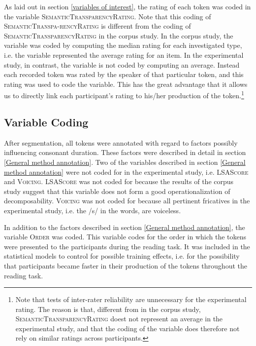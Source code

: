  As laid out in section \ref{variables of interest}, the rating of each token was coded in the variable  \textsc{SemanticTransparencyRating}. Note that this coding of \textsc{SemanticTranspa-rencyRating} is different from the coding of \textsc{SemanticTransparencyRating} in the corpus study. In the corpus study, the variable was coded by computing the median rating for each investigated type, i.e. the variable represented the average rating for an item. 
 In the experimental study, in contrast, the variable is not coded by computing an average. Instead each recorded token 
 was rated by the speaker of that particular token, and this rating was used to code the variable.
 This has the great advantage that it allows us to directly link each participant's rating to his/her production of the token.\footnote{Note that tests of inter-rater reliability are unnecessary for the experimental rating. The reason is that, different from in the corpus study, \textsc{SemanticTransparencyRating} doest not represent an average in the experimental study, and that the coding of the variable does therefore not rely on similar ratings across participants.} 
 \vspace{-0.3cm}



\subsection{Variable Coding} \label{variable coding experiment}
 \vspace{-0.1cm}


After segmentation, all tokens were annotated with regard to factors possibly influencing consonant duration. These factors were described in detail in section \ref{General method annotation}. 
Two of the variables described in section \ref{General method annotation} were not coded for in the experimental study, i.e. \textsc{LSAScore} and \textsc{Voicing}. 
\textsc{LSAScore} was not coded for because the results of the corpus study suggest that this variable does not form a good operationalization of decomposability. 
\textsc{Voicing} was not coded for because all pertinent fricatives in the experimental study, i.e. the /s/ in the words, are voiceless.

In addition to the factors described in section \ref{General method annotation}, the variable \textsc{Order} was coded. This variable codes for the order in which the tokens were presented to the participants during the reading task. It was included in the statistical models to control for possible training effects, i.e. for the possibility that participants became faster in their production of the tokens throughout the reading task.

